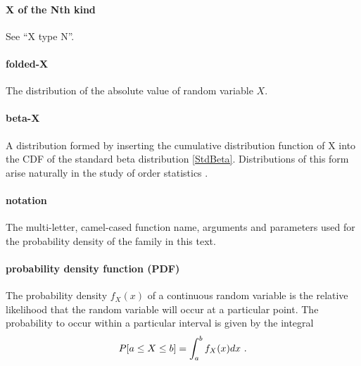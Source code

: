 \paragraph*{X of the Nth kind} See ``X type N''.

\paragraph*{folded-X} The distribution of the absolute value of random variable $X$. %

\paragraph*{beta-X} A distribution formed by inserting the cumulative distribution function of X into the CDF of the standard beta distribution \eqref{StdBeta}. Distributions of this form arise naturally in the study of order statistics .


\clearpage
{}
\label{PropertiesSec}


\paragraph*{notation} The multi-letter, camel-cased function name, arguments and parameters used for the probability
density of the family in this text. 



\paragraph*{probability density function (PDF)} 
The probability density $f_X(x)$ of a continuous random variable is the relative likelihood that the random variable will occur at a particular point. The probability to occur  within a particular interval is given by the integral
\[
P[ a\leq X \leq b] = \int_a^b f_X(x) dx \ . 
\notag
\]



